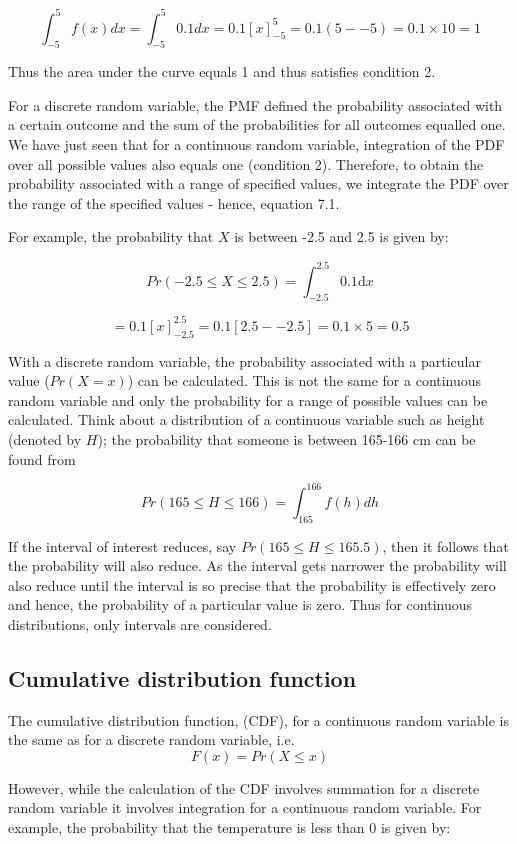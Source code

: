 \documentclass[
  oneside]{krantz}
\begin{document}
\[\int _{-5}^{5} f(x)dx = \int _{-5}^{5} 0.1 dx = 0.1[x ]_{-5}^5 = 0.1(5 - -5) = 0.1 \times 10 = 1\]

Thus the area under the curve equals 1 and thus satisfies condition 2.

For a discrete random variable, the PMF defined the probability associated with a certain outcome and the sum of the probabilities for all outcomes equalled one. We have just seen that for a continuous random variable, integration of the PDF over all possible values also equals one (condition 2). Therefore, to obtain the probability associated with a range of specified values, we integrate the PDF over the range of the specified values - hence, equation 7.1.

For example, the probability that \(X\) is between -2.5 and 2.5 is given by:

\[Pr(-2.5 \le X \le 2.5) = \int_{-2.5}^{2.5} 0.1 \mathrm{d}x \]

\[ = 0.1[x]_{-2.5}^{2.5} = 0.1[2.5 - -2.5] = 0.1 \times 5 = 0.5\]

With a discrete random variable, the probability associated with a particular value (\(Pr(X=x)\)) can be calculated. This is not the same for a continuous random variable and only the probability for a range of possible values can be calculated. Think about a distribution of a continuous variable such as height (denoted by \(H\)); the probability that someone is between 165-166 cm can be found from

\[Pr(165 \le H \le 166) = \int_{165}^{166} f(h)dh \]

If the interval of interest reduces, say \(Pr(165 \le H \le 165.5)\), then it follows that the probability will also reduce. As the interval gets narrower the probability will also reduce until the interval is so precise that the probability is effectively zero and hence, the probability of a particular value is zero. Thus for continuous distributions, only intervals are considered.

\hypertarget{cumulative-distribution-function-1}{%
\subsection{Cumulative distribution function}\label{cumulative-distribution-function-1}}

The cumulative distribution function, (CDF), for a continuous random variable is the same as for a discrete random variable, i.e.~
\[ F(x) = Pr(X \leq x) \]

However, while the calculation of the CDF involves summation for a discrete random variable it involves integration for a continuous random variable. For example, the probability that the temperature is less than 0 is given by:
\end{document}
